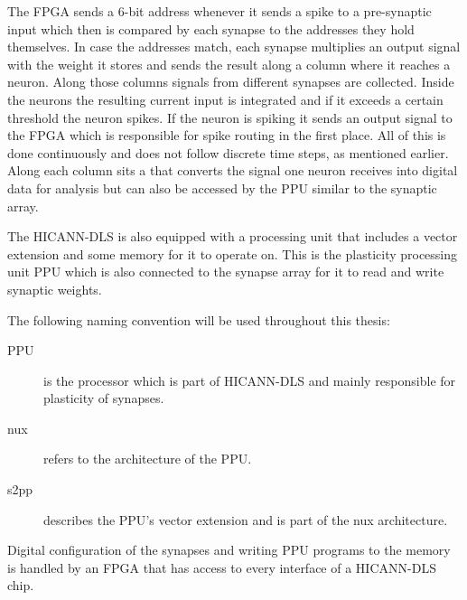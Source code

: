 The \ac{FPGA} sends a 6-bit address whenever it sends a spike to a pre-synaptic input which then is compared by each synapse to the addresses they hold themselves.
In case the addresses match, each synapse multiplies an output signal with the weight it stores and sends the result along a column where it reaches a neuron.
Along those columns signals from different synapses are collected.
Inside the neurons the resulting current input is integrated and if it exceeds a certain threshold the neuron spikes.
If the neuron is spiking it sends an output signal to the FPGA which is responsible for spike routing in the first place.
All of this is done continuously and does not follow discrete time steps, as mentioned earlier.
Along each column sits a  that converts the signal one neuron receives into digital data for analysis but can also be accessed by the \ac{PPU} similar to the synaptic array.

The \ac{HICANN-DLS} is also equipped with a processing unit that includes a vector extension and some memory for it to operate on.
This is the plasticity processing unit \ac{PPU} which is also connected to the synapse array for it to read and write synaptic weights.

The following naming convention will be used throughout this thesis:
\begin{description}
    \item[\ac{PPU}] is the processor which is part of \ac{HICANN-DLS} and mainly responsible for plasticity of synapses.
    \item[nux] refers to the architecture of the \ac{PPU}.
    \item[s2pp] describes the \ac{PPU}'s vector extension and is part of the nux architecture.
\end{description}

Digital configuration of the synapses and writing \ac{PPU} programs to the memory is handled by an \ac{FPGA} that has access to every interface of a \ac{HICANN-DLS} chip.

